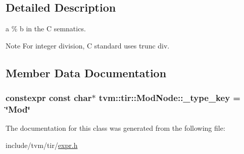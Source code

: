 \subsection{Detailed Description}
a \% b in the C semnatics. 

\begin{DoxyNote}{Note}
For integer division, C standard uses trunc div. 
\end{DoxyNote}


\subsection{Member Data Documentation}
\subsubsection[{\texorpdfstring{\+\_\+type\+\_\+key}{_type_key}}]{\setlength{\rightskip}{0pt plus 5cm}constexpr const char$\ast$ tvm\+::tir\+::\+Mod\+Node\+::\+\_\+type\+\_\+key = \char`\"{}Mod\char`\"{}\hspace{0.3cm}{\ttfamily [static]}}\hypertarget{classtvm_1_1tir_1_1ModNode_a37e351d32690214154bd1545b990f43a}{}\label{classtvm_1_1tir_1_1ModNode_a37e351d32690214154bd1545b990f43a}


The documentation for this class was generated from the following file\+:\begin{DoxyCompactItemize}
\item 
include/tvm/tir/\hyperlink{tir_2expr_8h}{expr.\+h}\end{DoxyCompactItemize}
